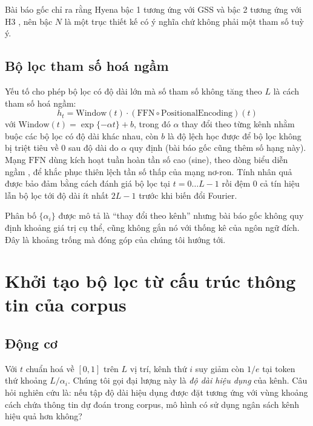 \documentclass[11pt]{article}
\begin{document}
Bài báo gốc chỉ ra rằng Hyena bậc 1 tương ứng với GSS \citep{mehta2022gss} và
bậc 2 tương ứng với H3 \citep{dao2023h3}, nên bậc $N$ là một trục thiết kế có
ý nghĩa chứ không phải một tham số tuỳ ý.

\subsection{Bộ lọc tham số hoá ngầm}

Yếu tố cho phép bộ lọc có độ dài lớn mà số tham số không tăng theo $L$ là cách
tham số hoá ngầm:
\begin{equation}
h_t = \mathrm{Window}(t) \cdot (\mathrm{FFN} \circ \mathrm{PositionalEncoding})(t)
\label{eq:filter}
\end{equation}
với $\mathrm{Window}(t) = \exp\{-\alpha t\} + b$, trong đó $\alpha$ thay đổi theo
từng kênh nhằm buộc các bộ lọc có độ dài khác nhau, còn $b$ là độ lệch học được
để bộ lọc không bị triệt tiêu về 0 sau độ dài do $\alpha$ quy định (bài báo gốc cũng
thêm số hạng này). Mạng $\mathrm{FFN}$ dùng kích
hoạt tuần hoàn tần số cao (sine), theo dòng biểu diễn ngầm
\citep{sitzmann2020siren, romero2021ckconv}, để khắc phục thiên lệch tần số thấp
của mạng nơ-ron. Tính nhân quả được bảo đảm bằng cách đánh giá bộ lọc tại
$t = 0 \dots L-1$ rồi đệm 0 cả tín hiệu lẫn bộ lọc tới độ dài ít nhất $2L-1$
trước khi biến đổi Fourier.

Phân bố $\{\alpha_i\}$ được mô tả là ``thay đổi theo kênh'' nhưng bài báo gốc không
quy định khoảng giá trị cụ thể, cũng không gắn nó với thống kê của ngôn ngữ
đích. Đây là khoảng trống mà đóng góp của chúng tôi hướng tới.

\section{Khởi tạo bộ lọc từ cấu trúc thông tin của corpus}

\subsection{Động cơ}

Với $t$ chuẩn hoá về $[0,1]$ trên $L$ vị trí, kênh thứ $i$ suy giảm còn $1/e$
tại token thứ khoảng $L/\alpha_i$. Chúng tôi gọi đại lượng này là \emph{độ dài
hiệu dụng} của kênh. Câu hỏi nghiên cứu là: nếu tập độ dài hiệu dụng được đặt
tương ứng với vùng khoảng cách chứa thông tin dự đoán trong corpus, mô hình có
sử dụng ngân sách kênh hiệu quả hơn không?
\end{document}
